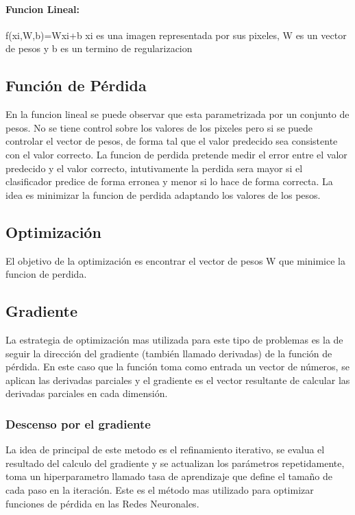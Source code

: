 \documentclass[a4paper,11pt,spanish]{book}
\begin{document}
      \paragraph{Funcion Lineal:} 
	f(xi,W,b)=Wxi+b
	xi es una imagen representada por sus pixeles, W es un vector de pesos y b es un termino de regularizacion

    \subsection{Función de Pérdida}
      En la funcion lineal se puede observar que esta parametrizada por un conjunto de pesos.
      No se tiene control sobre los valores de los pixeles pero si se puede controlar el vector de pesos, de forma tal que el valor predecido sea consistente con el valor correcto. 
      La funcion de perdida pretende medir el error entre el valor predecido y el valor correcto, intutivamente la perdida sera mayor si el clasificador predice de forma erronea y 
      menor si lo hace de forma correcta.
      La idea es minimizar la funcion de perdida adaptando los valores de los pesos.

    \subsection{Optimización}
      El objetivo de la optimización es encontrar el vector de pesos W que minimice la funcion de perdida.

    \subsection{Gradiente} 
      La estrategia de optimización mas utilizada para este tipo de problemas es la de seguir la dirección del gradiente (también llamado derivadas) de la función de pérdida.
      En este caso que la función toma como entrada un vector de números, se aplican las derivadas parciales y el gradiente es el vector resultante de calcular las derivadas parciales
      en cada dimensión.

      \subsubsection{Descenso por el gradiente}
	La idea de principal de este metodo es el refinamiento iterativo, se evalua el resultado del calculo del gradiente y se actualizan los parámetros repetidamente, 
	toma un hiperparametro llamado tasa de aprendizaje que define el tamaño de cada paso en la iteración.
	Este es el método mas utilizado para optimizar funciones de pérdida en las Redes Neuronales. 
\end{document}
